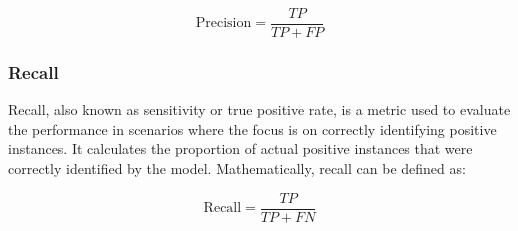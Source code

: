 \begin{equation*}
    \text{Precision} = \frac{TP}{TP + FP}
\end{equation*}

\subsubsection{Recall}
Recall, also known as sensitivity or true positive rate, is a metric used to evaluate the performance in scenarios where the focus is on correctly identifying positive instances. It calculates the proportion of actual positive instances that were correctly identified by the model. Mathematically, recall can be defined as:

\begin{equation*}
    \text{Recall} = \frac{TP}{TP + FN}
\end{equation*}

